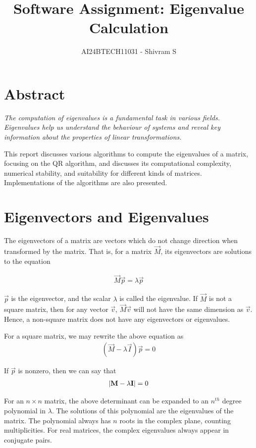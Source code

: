 \documentclass{article}
\title{Software Assignment: Eigenvalue Calculation}
\author{AI24BTECH11031 - Shivram S}
\date{}
\begin{document}
\twocolumn
\maketitle
\tableofcontents

\section{Abstract}

\em
The computation of eigenvalues is a fundamental task in various fields. Eigenvalues
help us understand the behaviour of systems and reveal key information about the
properties of linear transformations.

This report discusses various algorithms to
compute the eigenvalues of a matrix, focusing on the QR algorithm, and discusses its
computational complexity, numerical stability, and suitability for different kinds of
matrices. Implementations of the algorithms are also presented.
\em

\section{Eigenvectors and Eigenvalues}

The eigenvectors of a matrix are vectors which do not change direction when transformed
by the matrix. That is, for a matrix $\vec{M}$, its eigenvectors are solutions to the
equation

\begin{align}    
\vec{M}\vec{p} = \lambda\vec{p}
\end{align}


$\vec{p}$ is the eigenvector, and the scalar $\lambda$ is called the eigenvalue.
If $\vec{M}$ is not a square matrix, then for any vector $\vec{v}$, $\vec{M}\vec{v}$
will not have the same dimension as $\vec{v}$. Hence, a non-square matrix does not have
any eigenvectors or eigenvalues.

For a square matrix, we may rewrite the above equation as
\begin{align}
(\vec{M} - \lambda\vec{I})\vec{p} = 0
\end{align}

If $\vec{p}$ is nonzero, then we can say that
\begin{align}
\left\vert\mathbf{M} - \lambda\mathbf{I}\right\vert = 0
\end{align}

For an $n \times n$ matrix, the above determinant can be expanded to an $n^{th}$ degree
polynomial in $\lambda$. The solutions of this polynomial are the eigenvalues of the matrix.
The polynomial always has $n$ roots in the complex plane, counting multiplicities. For real
matrices, the complex eigenvalues always appear in conjugate pairs.
\end{document}

